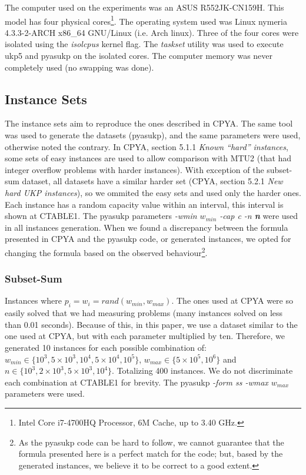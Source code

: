 \documentclass[runningheads,a4paper]{llncs}
\begin{document}
The computer used on the experiments was an ASUS R552JK-CN159H. This model has four physical cores\footnote{Intel Core i7-4700HQ Processor, 6M Cache, up to 3.40 GHz.}. The operating system used was Linux nymeria 4.3.3-2-ARCH x86\_64 GNU/Linux (i.e. Arch linux). Three of the four cores were isolated using the \emph{isolcpus} kernel flag. The \emph{taskset} utility was used to execute ukp5 and pyasukp on the isolated cores. The computer memory was never completely used (no swapping was done).

\subsection{Instance Sets}
The instance sets aim to reproduce the ones described in CPYA. The same tool was used to generate the datasets (pyasukp), and the same parameters were used, otherwise noted the contrary. In CPYA, section 5.1.1 \emph{Known ``hard'' instances}, some sets of easy instances are used to allow comparison with MTU2 (that had integer overflow problems with harder instances). With exception of the subset-sum dataset, all datasets have a similar harder set (CPYA, section 5.2.1 \emph{New hard UKP instances}), so we ommited the easy sets and used only the harder ones. Each instance has a random capacity value within an interval, this interval is shown at CTABLE1. The pyasukp parameters \emph{-wmin \(w_{min}\) -cap c -n \textbf{n}} were used in all instances generation. When we found a discrepancy between the formula presented in CPYA and the pyasukp code, or generated instances, we opted for changing the formula based on the observed behaviour\footnote{As the pyasukp code can be hard to follow, we cannot guarantee that the formula presented here is a perfect match for the code; but, based by the generated instances, we believe it to be correct to a good extent.}.

\subsubsection{Subset-Sum}\label{sec:subsetsum}
Instances where \(p_i = w_i = rand(w_{min}, w_{max})\). The ones used at CPYA were so easily solved that we had measuring problems (many instances solved on less than 0.01 seconds). Because of this, in this paper, we use a dataset similar to the one used at CPYA, but with each parameter multiplied by ten. Therefore, we generated 10 instances for each possible combination of: \(w_{min} \in \{10^3, 5\times10^3, 10^4, 5\times10^4, 10^5\}\), \(w_{max} \in \{5\times10^5, 10^6\}\) and \(n \in \{10^3, 2\times10^3, 5\times10^3, 10^4\}\). Totalizing 400 instances. We do not discriminate each combination at CTABLE1 for brevity. The pyasukp \emph{-form ss -wmax \(w_{max}\)} parameters were used.
\end{document}
